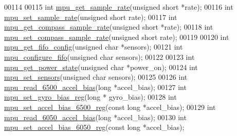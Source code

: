 \begin{DoxyCode}
00114 
00115 \textcolor{keywordtype}{int} \hyperlink{group___d_r_i_v_e_r_s_ga2487dd551b701c1c7ed4d6335f02b2f1}{mpu\_get\_sample\_rate}(\textcolor{keywordtype}{unsigned} \textcolor{keywordtype}{short} *rate);
00116 \textcolor{keywordtype}{int} \hyperlink{group___d_r_i_v_e_r_s_ga0144d666a67a82888b8580002afe8b55}{mpu\_set\_sample\_rate}(\textcolor{keywordtype}{unsigned} \textcolor{keywordtype}{short} rate);
00117 \textcolor{keywordtype}{int} \hyperlink{group___d_r_i_v_e_r_s_gab5a45cd7783f6937788c0decb0b18b16}{mpu\_get\_compass\_sample\_rate}(\textcolor{keywordtype}{unsigned} \textcolor{keywordtype}{short} *rate);
00118 \textcolor{keywordtype}{int} \hyperlink{group___d_r_i_v_e_r_s_ga78da3828de0ef9d080c4d03e7bc45e7b}{mpu\_set\_compass\_sample\_rate}(\textcolor{keywordtype}{unsigned} \textcolor{keywordtype}{short} rate);
00119 
00120 \textcolor{keywordtype}{int} \hyperlink{group___d_r_i_v_e_r_s_ga093f11eb10b2639a4b9fe344ea348c54}{mpu\_get\_fifo\_config}(\textcolor{keywordtype}{unsigned} \textcolor{keywordtype}{char} *sensors);
00121 \textcolor{keywordtype}{int} \hyperlink{group___d_r_i_v_e_r_s_gababbdda287e1f19323489f90a0889dd7}{mpu\_configure\_fifo}(\textcolor{keywordtype}{unsigned} \textcolor{keywordtype}{char} sensors);
00122 
00123 \textcolor{keywordtype}{int} \hyperlink{group___d_r_i_v_e_r_s_gaec8fa7a067988d174516bb735a4a0bc9}{mpu\_get\_power\_state}(\textcolor{keywordtype}{unsigned} \textcolor{keywordtype}{char} *power\_on);
00124 \textcolor{keywordtype}{int} \hyperlink{group___d_r_i_v_e_r_s_ga6e77e7cc1cf6be5e8fdf617c5b4586d1}{mpu\_set\_sensors}(\textcolor{keywordtype}{unsigned} \textcolor{keywordtype}{char} sensors);
00125 
00126 \textcolor{keywordtype}{int} \hyperlink{group___d_r_i_v_e_r_s_ga57bfbb356ce449135ce39659455041ae}{mpu\_read\_6500\_accel\_bias}(\textcolor{keywordtype}{long} *accel\_bias);
00127 \textcolor{keywordtype}{int} \hyperlink{group___d_r_i_v_e_r_s_ga01361a0f5c1f048cb0742bd3d0e4d3a5}{mpu\_set\_gyro\_bias\_reg}(\textcolor{keywordtype}{long} * gyro\_bias);
00128 \textcolor{keywordtype}{int} \hyperlink{group___d_r_i_v_e_r_s_gaa7265afee29b8307ff49a8b1ccd9238a}{mpu\_set\_accel\_bias\_6500\_reg}(\textcolor{keyword}{const} \textcolor{keywordtype}{long} *accel\_bias);
00129 \textcolor{keywordtype}{int} \hyperlink{group___d_r_i_v_e_r_s_gaed37421e1f140d10ee0eff0efeade27b}{mpu\_read\_6050\_accel\_bias}(\textcolor{keywordtype}{long} *accel\_bias);
00130 \textcolor{keywordtype}{int} \hyperlink{group___d_r_i_v_e_r_s_gae2eb5073dacc7455101bf6818e35c40a}{mpu\_set\_accel\_bias\_6050\_reg}(\textcolor{keyword}{const} \textcolor{keywordtype}{long} *accel\_bias);

\end{DoxyCode}
